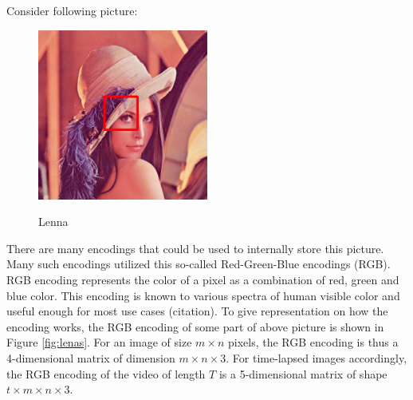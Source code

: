 \documentclass[pdftex,12pt,a4paper]{report}
\begin{document}
Consider following picture:

\begin{figure}[h]
\centering
\includegraphics[width=0.5\textwidth]{lenna_marked}
\label{fig:lena}
\caption{Lenna}

\end{figure}

There are many encodings that could be used to internally store this picture. Many such encodings utilized this so-called Red-Green-Blue encodings (RGB). RGB encoding represents the color of a pixel as a combination of red, green and blue color. This encoding is known to various spectra of human visible color and useful enough for most use cases (citation). To give representation on how the encoding works, the RGB encoding of some part of above picture is shown in Figure \ref{fig:lenas}. For an image of size $m \times n$ pixels, the RGB encoding is thus a 4-dimensional matrix of dimension $m \times n \times 3$. For time-lapsed images accordingly, the RGB encoding of the video of length $T$ is a 5-dimensional matrix of shape $t \times m \times n \times 3$.

\end{document}
